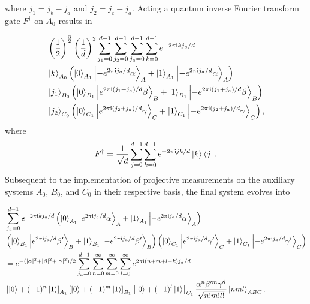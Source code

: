 \documentclass[aps,twocolumn,superscriptaddress,showpacs,nofootinbib]{revtex4-2}
\renewcommand{\i}{\mathrm{i}}
\begin{document}
\begin{widetext}
where $j_1 = j_b - j_a$ and $j_2 = j_c - j_a$. Acting a quantum inverse Fourier transform gate $F^\dagger$ on $A_0$ results in

\begin{equation}
\begin{split}
&\left( \frac{1}{2} \right)^{\frac{3}{2}} \left( \frac{1}{d} \right)^2 \sum_{j_1=0}^{d-1}\sum_{j_2=0}^{d-1}\sum_{j_a=0}^{d-1}\sum_{k=0}^{d-1}e^{-2\pi \i  k j_a/d}\\
&\ket{k}_{A_0}
\left( \ket{0}_{A_1}\ket{-e^{2\pi \i  j_a /d}\alpha}_A + \ket{1}_{A_1}\ket{-e^{2\pi \i  j_a /d}\alpha} _A\right) \\
& \ket{j_1}_{B_0}\left( \ket{0}_{B_1}\ket{e^{2\pi \i  (j_1+j_a) /d}\beta}_B + \ket{1}_{B_1}\ket{-e^{2\pi \i  (j_1+j_a) /d}\beta}_B \right)\\
&\ket{j_2}_{C_0}\left( \ket{0}_{C_1}\ket{e^{2\pi \i  (j_2+j_a) /d}\gamma}_C + \ket{1}_{C_1}\ket{-e^{2\pi \i  (j_2+j_a) /d}\gamma}_C \right),
\end{split}
\end{equation}
where
\begin{equation}
F^\dagger = \frac{1}{\sqrt{d}}\sum_{j=0}^{d-1}\sum_{k=0}^{d-1}e^{-2\pi \i j k/d}\ket{k}\bra{j}.
\end{equation}
Subsequent to the implementation of projective measurements on the auxiliary systems $A_0$, $B_0$, and $C_0$ in their respective basis, the final system evolves into

\begin{equation}
\begin{split}
&
\sum_{j_a = 0}^{d-1} e^{-2\pi \i kj_a/d}
\left( \ket{0}_{A_1} \ket{e^{2\pi \i  j_a /d}\alpha}_A + \ket{1}_{A_1} \ket{-e^{2\pi \i  j_a /d}\alpha}_A \right) \\
&
\left( \ket{0}_{B_1} \ket{e^{2\pi \i  j_a /d}\beta '}_B + \ket{1}_{B_1} \ket{-e^{2\pi \i  j_a /d}\beta '}_B \right)
\left( \ket{0}_{C_1} \ket{e^{2\pi \i  j_a /d}\gamma '}_C + \ket{1}_{C_1} \ket{-e^{2\pi \i  j_a /d}\gamma '}_C \right) \\
&
= e^{-(|\alpha|^2+|\beta|^2+|\gamma|^2)/2} \sum_{j_a=0}^{d-1} \sum_{n=0}^{\infty}\sum_{m=0}^{\infty}\sum_{l=0}^{\infty} e^{2\pi \i (n+m+l-k)j_a/d}\\
&
\left[\ket{0}+(-1)^n\ket{1}\right]_{A_1}
\left[\ket{0}+(-1)^m\ket{1}\right]_{B_1}
\left[\ket{0}+(-1)^l\ket{1}\right]_{C_1} \frac{\alpha^n\beta'^m\gamma'^l}{\sqrt{n!m!l!}}\ket{nml}_{ABC}.
\end{split}
\end{equation}
\end{widetext}
\end{document}
